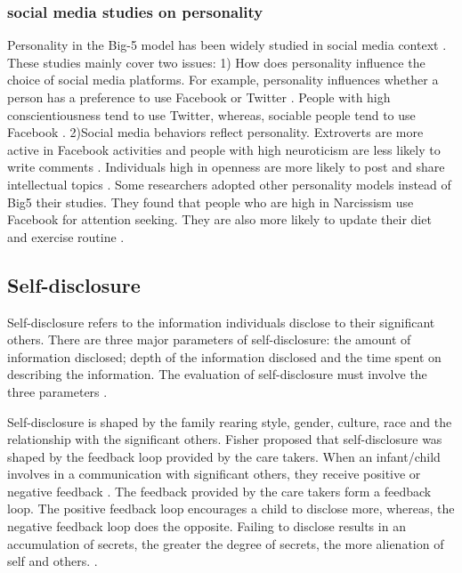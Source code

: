 \subsubsection{social media studies on personality}
Personality in the Big-5 model has been widely studied in social media context  \cite{ross_personality_2009,ma_anonymity_2016,hollenbaugh_facebook_2014,rife_participant_2016,farnadi_computational_2016,ross_personality_2009,moore_influence_2012,back_facebook_2010,seidman_self-presentation_2013,hughes_tale_2012,hong_analysis_2014,skues_effects_2012,zhang_gratifications_2011,lee_personality_2014,jenkins-guarnieri_relationships_2012,blachnio_psychological_2013,wang2013share}. These studies mainly cover two issues: 1) How does personality influence the choice of social media platforms. For example, personality influences whether a person has a preference to use Facebook or Twitter \cite{hughes_tale_2012}. People with high conscientiousness tend to use Twitter, whereas, sociable people tend to use Facebook \cite{ross_personality_2009}. 2)Social media behaviors reflect personality. Extroverts are more active in Facebook activities and people with high neuroticism are less likely to write comments \cite{skues_effects_2012}. Individuals high in openness are more likely to post and share intellectual topics \cite{marshall_big_2015}. Some researchers adopted other personality models instead of Big5 their studies. They found that people who are high in Narcissism use Facebook for attention seeking. They are also more likely to update their diet and exercise routine \cite{marshall_big_2015,andreassen_relationship_2017}. 

\subsection{Self-disclosure}
Self-disclosure refers to the information individuals disclose to their significant others. There are three major parameters of self-disclosure: the amount of information disclosed; depth of the information disclosed and the time spent on describing the information. The evaluation of self-disclosure must involve the three parameters \cite{cozby1973self}.

Self-disclosure is shaped by the family rearing style, gender, culture, race and the relationship with the significant others. Fisher proposed that self-disclosure was shaped by the feedback loop provided by the care takers. When an infant/child involves in a communication with significant others, they receive positive or negative feedback \cite{patterson2002recent}. The feedback provided by the care takers form a feedback loop. The positive feedback loop encourages a child to disclose more, whereas, the negative feedback loop does the opposite. Failing to disclose results in an accumulation of secrets, the greater the degree of secrets, the more alienation of self and others. \cite{patterson2002recent}. 


